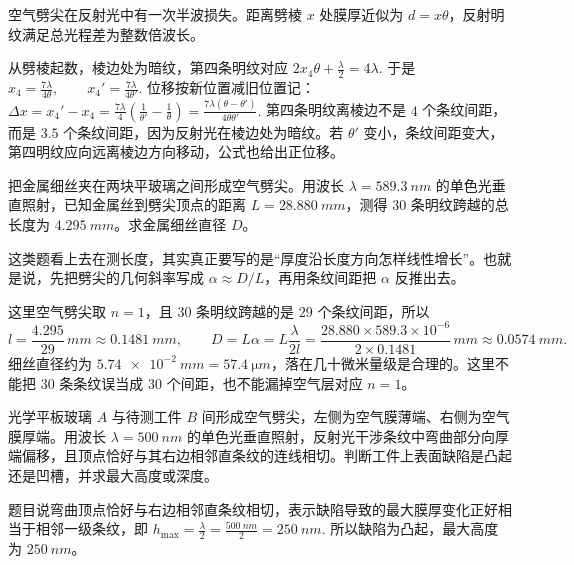 \begin{solution}
空气劈尖在反射光中有一次半波损失。距离劈棱 \(x\) 处膜厚近似为 \(d=x\theta\)，反射明纹满足总光程差为整数倍波长。

从劈棱起数，棱边处为暗纹，第四条明纹对应
 \(2x_4\theta+\frac{\lambda}{2}=4\lambda.\) 
于是
 \(x_4=\frac{7\lambda}{4\theta},\qquad x_4'=\frac{7\lambda}{4\theta'}.\) 
位移按新位置减旧位置记：
 \(\Delta x=x_4'-x_4 =\frac{7\lambda}{4}\left(\frac{1}{\theta'}-\frac{1}{\theta}\right) =\frac{7\lambda(\theta-\theta')}{4\theta\theta'}.\) 
第四条明纹离棱边不是 \(4\) 个条纹间距，而是 \(3.5\) 个条纹间距，因为反射光在棱边处为暗纹。若 \(\theta'\) 变小，条纹间距变大，第四明纹应向远离棱边方向移动，公式也给出正位移。
\end{solution}


\begin{exercise}[用劈尖条纹间距测金属细丝直径时为什么先写几何斜率]
把金属细丝夹在两块平玻璃之间形成空气劈尖。用波长 \(\lambda=\SI{589.3}{nm}\) 的单色光垂直照射，已知金属丝到劈尖顶点的距离 \(L=\SI{28.880}{mm}\)，测得 \(30\) 条明纹跨越的总长度为 \(\SI{4.295}{mm}\)。求金属细丝直径 \(D\)。
\end{exercise}

\begin{solution}
这类题看上去在测长度，其实真正要写的是“厚度沿长度方向怎样线性增长”。也就是说，先把劈尖的几何斜率写成 \(\alpha\approx D/L\)，再用条纹间距把 \(\alpha\) 反推出去。

这里空气劈尖取 \(n=1\)，且 \(30\) 条明纹跨越的是 \(29\) 个条纹间距，所以
\[
l=\frac{4.295}{29}\,\si{mm}\approx \SI{0.1481}{mm},\qquad
D=L\alpha=L\frac{\lambda}{2l}
=\frac{28.880\times 589.3\times10^{-6}}{2\times0.1481}\,\si{mm}
\approx \SI{0.0574}{mm}.
\]
细丝直径约为 \(\SI{5.74e-2}{mm}=\SI{57.4}{\micro m}\)，落在几十微米量级是合理的。这里不能把 \(30\) 条条纹误当成 \(30\) 个间距，也不能漏掉空气层对应 \(n=1\)。
\end{solution}


\begin{exercise}[空气劈尖条纹弯向厚端时怎样判断凸凹缺陷]
光学平板玻璃 \(A\) 与待测工件 \(B\) 间形成空气劈尖，左侧为空气膜薄端、右侧为空气膜厚端。用波长 \(\lambda=\SI{500}{nm}\) 的单色光垂直照射，反射光干涉条纹中弯曲部分向厚端偏移，且顶点恰好与其右边相邻直条纹的连线相切。判断工件上表面缺陷是凸起还是凹槽，并求最大高度或深度。
\end{exercise}

\begin{solution}
题目说弯曲顶点恰好与右边相邻直条纹相切，表示缺陷导致的最大膜厚变化正好相当于相邻一级条纹，即
 \(h_{\max}=\frac{\lambda}{2} =\frac{\SI{500}{nm}}{2} =\SI{250}{nm}.\) 
所以缺陷为凸起，最大高度为 \(\SI{250}{nm}\)。
\end{solution}
